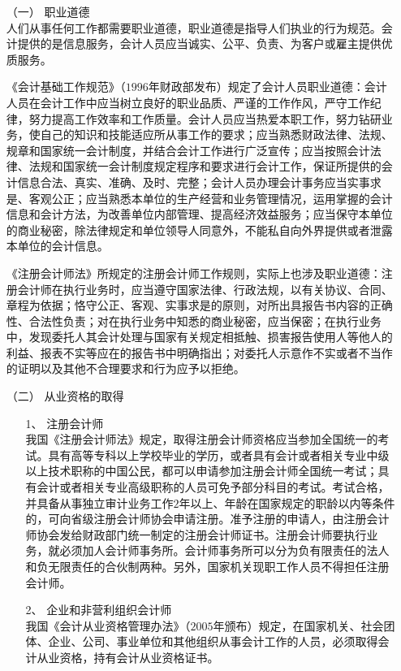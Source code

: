 				\begin{enumerate}
					\item[（一）] 职业道德 \\
						人们从事任何工作都需要职业道德，职业道德是指导人们执业的行为规范。会计提供的是信息服务，会计人员应当诚实、公平、负责、为客户或雇主提供优质服务。
						
						《会计基础工作规范》（$1996$年财政部发布）规定了会计人员职业道德：会计人员在会计工作中应当树立良好的职业品质、严谨的工作作风，严守工作纪律，努力提高工作效率和工作质量。会计人员应当热爱本职工作，努力钻研业务，使自己的知识和技能适应所从事工作的要求；应当熟悉财政法律、法规、规章和国家统一会计制度，并结合会计工作进行广泛宣传；应当按照会计法律、法规和国家统一会计制度规定程序和要求进行会计工作，保证所提供的会计信息合法、真实、准确、及时、完整；会计人员办理会计事务应当实事求是、客观公正；应当熟悉本单位的生产经营和业务管理情况，运用掌握的会计信息和会计方法，为改善单位内部管理、提高经济效益服务；应当保守本单位的商业秘密，除法律规定和单位领导人同意外，不能私自向外界提供或者泄露本单位的会计信息。
						
						《注册会计师法》所规定的注册会计师工作规则，实际上也涉及职业道德：注册会计师在执行业务时，应当遵守国家法律、行政法规，以有关协议、合同、章程为依据；恪守公正、客观、实事求是的原则，对所出具报告书内容的正确性、合法性负责；对在执行业务中知悉的商业秘密，应当保密；在执行业务中，发现委托人其会计处理与国家有关规定相抵触、损害报告使用人等他人的利益、报表不实等应在的报告书中明确指出；对委托人示意作不实或者不当作的证明以及其他不合理要求和行为应予以拒绝。
					\item[（二）] 从业资格的取得
						\begin{enumerate}
							\item[1、] 注册会计师 \\
								我国《注册会计师法》规定，取得注册会计师资格应当参加全国统一的考试。具有高等专科以上学校毕业的学历，或者具有会计或者相关专业中级以上技术职称的中国公民，都可以申请参加注册会计师全国统一考试；具有会计或者相关专业高级职称的人员可免予部分科目的考试。考试合格，并具备从事独立审计业务工作$2$年以上、年龄在国家规定的职龄以内等条件的，可向省级注册会计师协会申请注册。准予注册的申请人，由注册会计师协会发给财政部门统一制定的注册会计师证书。注册会计师要执行业务，就必须加人会计师事务所。会计师事务所可以分为负有限责任的法人和负无限责任的合伙制两种。另外，国家机关现职工作人员不得担任注册会计师。 

								\item[2、] 企业和非营利组织会计师 \\
								我国《会计从业资格管理办法》（$2005$年颁布）规定，在国家机关、社会团体、企业、公司、事业单位和其他组织从事会计工作的人员，必须取得会计从业资格，持有会计从业资格证书。
								

\end{enumerate}
\end{enumerate}
